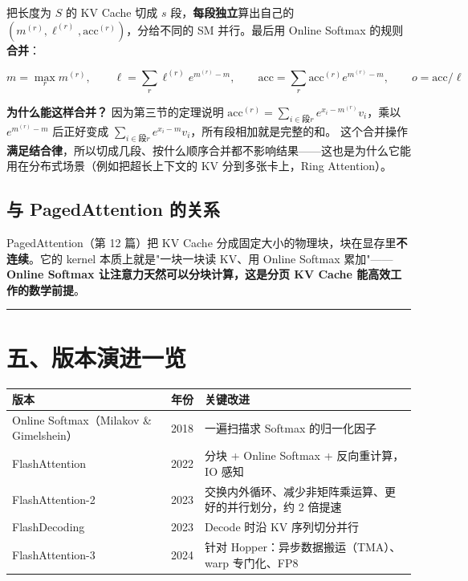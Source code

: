 把长度为 $S$ 的 KV Cache 切成 $s$ 段，\textbf{每段独立}算出自己的 $(m^{(r)}, \ell^{(r)}, \text{acc}^{(r)})$，分给不同的 SM 并行。最后用 Online Softmax 的规则\textbf{合并}：

\[
m = \max_r m^{(r)}, \qquad \ell = \sum_r \ell^{(r)} e^{m^{(r)} - m}, \qquad \text{acc} = \sum_r \text{acc}^{(r)} e^{m^{(r)} - m}, \qquad o = \text{acc} / \ell
\]

\textbf{为什么能这样合并？} 因为第三节的定理说明 $\text{acc}^{(r)} = \sum_{i \in \text{段}r} e^{x_i - m^{(r)}} v_i$，乘以 $e^{m^{(r)} - m}$ 后正好变成 $\sum_{i \in \text{段}r} e^{x_i - m} v_i$，所有段相加就是完整的和。
这个合并操作\textbf{满足结合律}，所以切成几段、按什么顺序合并都不影响结果——这也是为什么它能用在分布式场景（例如把超长上下文的 KV 分到多张卡上，Ring Attention）。

\subsection{与 PagedAttention 的关系}

PagedAttention（第 12 篇）把 KV Cache 分成固定大小的物理块，块在显存里\textbf{不连续}。它的 kernel 本质上就是"一块一块读 KV、用 Online Softmax 累加"——\textbf{Online Softmax 让注意力天然可以分块计算，这是分页 KV Cache 能高效工作的数学前提}。

\vspace{0.8em}\hrule\vspace{0.8em}

\section{五、版本演进一览}

\begin{center}
\small
\begin{tabularx}{\textwidth}{p{3cm} p{4.5cm} X}
\toprule
\textbf{版本} & \textbf{年份} & \textbf{关键改进} \\
\midrule
Online Softmax（Milakov \& Gimelshein） & 2018 & 一遍扫描求 Softmax 的归一化因子 \\
FlashAttention & 2022 & 分块 + Online Softmax + 反向重计算，IO 感知 \\
FlashAttention-2 & 2023 & 交换内外循环、减少非矩阵乘运算、更好的并行划分，约 2 倍提速 \\
FlashDecoding & 2023 & Decode 时沿 KV 序列切分并行 \\
FlashAttention-3 & 2024 & 针对 Hopper：异步数据搬运（TMA）、warp 专门化、FP8 \\
\bottomrule
\end{tabularx}
\end{center}

